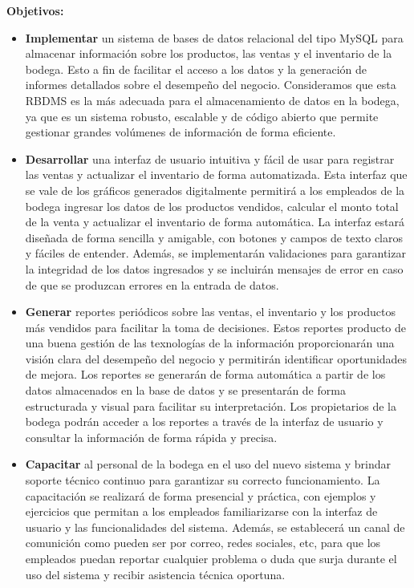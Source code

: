\documentclass{article}
\begin{document}
  \textbf{Objetivos:}
    \begin{itemize}
      \item \textbf{Implementar} un sistema de bases de datos relacional del tipo MySQL para almacenar información sobre los productos, las ventas y el inventario de la bodega. Esto a fin de facilitar el acceso a los datos y la generación de informes detallados sobre el desempeño del negocio. Consideramos que esta RBDMS es la más adecuada para el almacenamiento de datos en la bodega, ya que es un sistema robusto, escalable y de código abierto que permite gestionar grandes volúmenes de información de forma eficiente.
        
      \item \textbf{Desarrollar} una interfaz de usuario intuitiva y fácil de usar para registrar las ventas y actualizar el inventario de forma automatizada. Esta interfaz que se vale de los gráficos generados digitalmente permitirá a los empleados de la bodega ingresar los datos de los productos vendidos, calcular el monto total de la venta y actualizar el inventario de forma automática. La interfaz estará diseñada de forma sencilla y amigable, con botones y campos de texto claros y fáciles de entender. Además, se implementarán validaciones para garantizar la integridad de los datos ingresados y se incluirán mensajes de error en caso de que se produzcan errores en la entrada de datos.
        
      \item \textbf{Generar} reportes periódicos sobre las ventas, el inventario y los productos más vendidos para facilitar la toma de decisiones. Estos reportes producto de una buena gestión de las texnologías de la información proporcionarán una visión clara del desempeño del negocio y permitirán identificar oportunidades de mejora. Los reportes se generarán de forma automática a partir de los datos almacenados en la base de datos y se presentarán de forma estructurada y visual para facilitar su interpretación. Los propietarios de la bodega podrán acceder a los reportes a través de la interfaz de usuario y consultar la información de forma rápida y precisa.
        
      \item \textbf{Capacitar} al personal de la bodega en el uso del nuevo sistema y brindar soporte técnico continuo para garantizar su correcto funcionamiento. La capacitación se realizará de forma presencial y práctica, con ejemplos y ejercicios que permitan a los empleados familiarizarse con la interfaz de usuario y las funcionalidades del sistema. Además, se establecerá un canal de comunición como pueden ser por correo, redes sociales, etc, para que los empleados puedan reportar cualquier problema o duda que surja durante el uso del sistema y recibir asistencia técnica oportuna.
        

\end{itemize}
\end{document}
